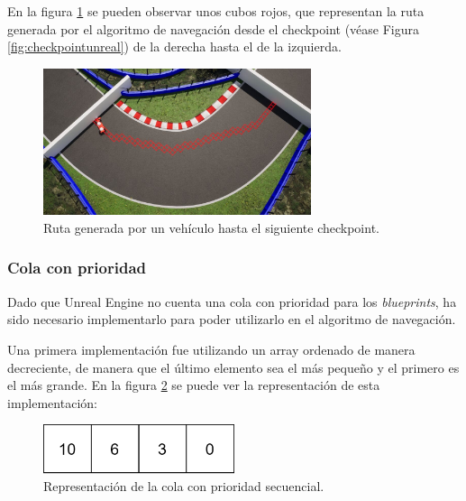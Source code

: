 

\bigskip

En la figura \ref{fig:rutaastar} se pueden observar unos cubos rojos, que representan la ruta generada por el algoritmo de navegación desde el checkpoint (véase Figura \ref{fig:checkpointunreal}) de la derecha hasta el de la izquierda.

\begin{figure}[H]
    \centering
    \includegraphics[width=0.7\textwidth]{imagenes/converted/rutaAStar.jpg}
    \caption{Ruta generada por un vehículo hasta el siguiente checkpoint.}
    \label{fig:rutaastar}
\end{figure}


\subsubsection{Cola con prioridad}
\label{sec:priorityqueue}

Dado que Unreal Engine no cuenta una cola con prioridad para los \textit{blueprints}, ha sido necesario implementarlo para poder utilizarlo en el algoritmo de navegación.

\bigskip

Una primera implementación fue utilizando un array ordenado de manera decreciente, de manera que el último elemento sea el más pequeño y el primero es el más grande. En la figura \ref{fig:seqpq} se puede ver la representación de esta implementación:

\begin{figure}[H]
    \centering
    \includegraphics[width=0.5\textwidth]{imagenes/PQSeq.png}
    \caption{Representación de la cola con prioridad secuencial.}
    \label{fig:seqpq}
\end{figure}

